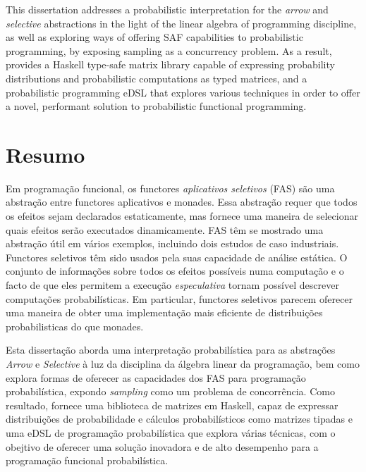 \documentclass[
  oneside,
  11pt, a4paper,
  footinclude=true,
  headinclude=true,
  cleardoublepage=empty
]{scrbook}
\theoremstyle{definition}
\theoremstyle{definition}
\begin{document}
    This dissertation addresses a probabilistic interpretation for the \emph{arrow} and \emph{selective} abstractions in the light of the linear algebra of programming discipline, as well as exploring ways of offering SAF capabilities to probabilistic programming, by exposing sampling as a concurrency problem. As a result, provides a Haskell type-safe matrix library capable of expressing probability distributions and probabilistic computations as typed matrices, and a probabilistic programming eDSL that explores various techniques in order to offer a novel, performant solution to probabilistic functional programming.
	
	\vskip0.5cm
	
	\cleardoublepage
	\chapter*{Resumo}
	
    Em programação funcional, os functores \emph{aplicativos seletivos} (FAS) são uma abstração entre functores aplicativos e monades. Essa abstração requer que todos os efeitos sejam declarados estaticamente, mas fornece uma maneira de selecionar quais efeitos serão executados dinamicamente. FAS têm se mostrado uma abstração útil em vários exemplos, incluindo dois estudos de caso industriais. Functores seletivos têm sido usados pela suas capacidade de análise estática. O conjunto de informações sobre todos os efeitos possíveis numa computação e o facto de que eles permitem a execução \emph{especulativa} tornam possível descrever computações probabilísticas. Em particular, functores seletivos parecem oferecer uma maneira de obter uma implementação mais eficiente de distribuições probabilisticas do que monades.
        
    Esta dissertação aborda uma interpretação probabilística para as abstrações \emph{Arrow} e \emph{Selective} à luz da disciplina da álgebra linear da programação, bem como explora formas de oferecer as capacidades dos FAS para programação probabilística, expondo \emph{sampling} como um problema de concorrência. Como resultado, fornece uma biblioteca de matrizes em Haskell, capaz de expressar distribuições de probabilidade e cálculos probabilísticos como matrizes tipadas e uma eDSL de programação probabilística que explora várias técnicas, com o obejtivo de oferecer uma solução inovadora e de alto desempenho para a programação funcional probabilística.
	
\end{document}
